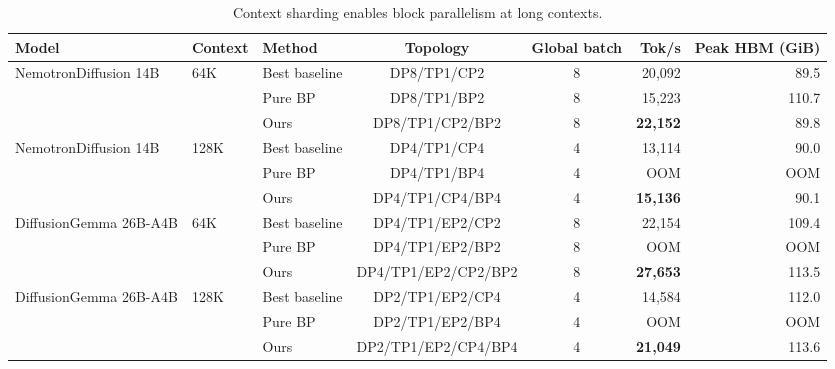 \begin{table}[H]
  \centering
  \caption{Context sharding enables block parallelism at long contexts.}
  \label{tab:pure-bp-ablation}
  \footnotesize
  \setlength{\tabcolsep}{1.75pt}
  \renewcommand{\arraystretch}{1.08}
  \ifdefined\iclrfinalcopy
    \def\fitpurebptable#1{\resizebox{\linewidth}{!}{#1}}
  \else
    \def\fitpurebptable#1{#1}
  \fi
  \fitpurebptable{%
  \begin{tabular}{lllccrr}
    \toprule
    Model & Context & Method & Topology & Global batch & Tok/s & Peak HBM (GiB) \\
    \midrule
    NemotronDiffusion 14B & 64K & Best baseline & DP8/TP1/CP2 & 8 & 20{,}092 & 89.5 \\
                  &     & Pure BP            & DP8/TP1/BP2 & 8 & 15{,}223 & 110.7 \\
                  &     & Ours               & DP8/TP1/CP2/BP2 & 8 & \textbf{22{,}152} & 89.8 \\
    \addlinespace
    NemotronDiffusion 14B & 128K & Best baseline & DP4/TP1/CP4 & 4 & 13{,}114 & 90.0 \\
                  &      & Pure BP            & DP4/TP1/BP4 & 4 & OOM & OOM \\
                  &      & Ours               & DP4/TP1/CP4/BP4 & 4 & \textbf{15{,}136} & 90.1 \\
    \midrule
    DiffusionGemma 26B-A4B & 64K & Best baseline & DP4/TP1/EP2/CP2 & 8 & 22{,}154 & 109.4 \\
                   &     & Pure BP            & DP4/TP1/EP2/BP2 & 8 & OOM & OOM \\
                   &     & Ours               & DP4/TP1/EP2/CP2/BP2 & 8 & \textbf{27{,}653} & 113.5 \\
    \addlinespace
    DiffusionGemma 26B-A4B & 128K & Best baseline & DP2/TP1/EP2/CP4 & 4 & 14{,}584 & 112.0 \\
                   &      & Pure BP            & DP2/TP1/EP2/BP4 & 4 & OOM & OOM \\
                   &      & Ours               & DP2/TP1/EP2/CP4/BP4 & 4 & \textbf{21{,}049} & 113.6 \\
    \bottomrule
  \end{tabular}}

\end{table}

